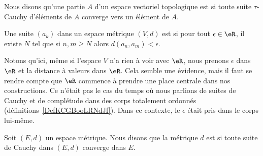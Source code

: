\begin{definition}      \label{DEFooVQDBooNxprFU}
    Nous disons qu'une partie \( A\) d'un espace vectoriel topologique est  si toute suite \(  \tau\)-Cauchy d'éléments de \( A\) converge vers un élément de \( A\).
\end{definition}

\begin{definition}      \label{DEFooXOYSooSPTRTn}
    Une suite \( (a_k)\) dans un espace métrique \( (V,d)\) est  si pour tout \( \epsilon\in \eR\), il existe \( N\) tel que si \( n,m\geq N\) alors \( d(a_n,a_m)<\epsilon\).
\end{definition}

Notons qu'ici, même si l'espace \( V\) n'a rien à voir avec \( \eR\), nous prenons \( \epsilon\) dans \( \eR\) et la distance à valeurs dans \( \eR\). Cela semble une évidence, mais il faut se rendre compte que \( \eR\) commence à prendre une place centrale dans nos constructions. Ce n'était pas le cas du temps où nous parlions de suites de Cauchy et de complétude dans des corps totalement ordonnés (définitions~\ref{DefKCGBooLRNdJf}). Dans ce contexte, le \( \epsilon\) était pris dans le corps lui-même.

\begin{definition}       \label{DEFooHBAVooKmqerL}
    Soit \( (E,d)\) un espace métrique. Nous disons que la métrique \( d\) est  si toute suite de Cauchy dans \( (E,d)\) converge dans \( E\).
\end{definition}

